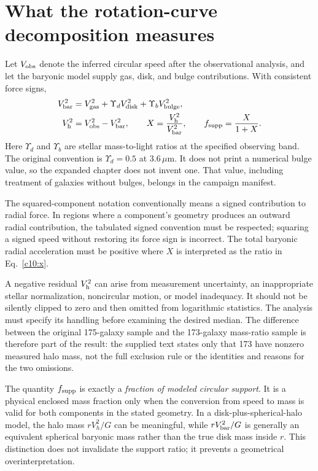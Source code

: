 \section{What the rotation-curve decomposition measures}

Let $V_{\rm obs}$ denote the inferred circular speed after the observational analysis, and let the baryonic model supply gas, disk, and bulge contributions. With consistent force signs,
\begin{align}
 V_{\rm bar}^2&=V_{\rm gas}^2+\Upsilon_dV_{\rm disk}^2
 +\Upsilon_bV_{\rm bulge}^2,\label{c10:baryons}\\
 V_{\rm h}^2&=V_{\rm obs}^2-V_{\rm bar}^2,\qquad
 X=\frac{V_{\rm h}^2}{V_{\rm bar}^2},\qquad
 f_{\rm supp}=\frac{X}{1+X}.
 \label{c10:x}
\end{align}
Here $\Upsilon_d$ and $\Upsilon_b$ are stellar mass-to-light ratios at the specified observing band. The original convention is $\Upsilon_d=0.5$ at $3.6\,\mu\mathrm m$. It does not print a numerical bulge value, so the expanded chapter does not invent one. That value, including treatment of galaxies without bulges, belongs in the campaign manifest.

The squared-component notation conventionally means a signed contribution to radial force. In regions where a component's geometry produces an outward radial contribution, the tabulated signed convention must be respected; squaring a signed speed without restoring its force sign is incorrect. The total baryonic radial acceleration must be positive where $X$ is interpreted as the ratio in Eq.~\eqref{c10:x}.

A negative residual $V_{\rm h}^2$ can arise from measurement uncertainty, an inappropriate stellar normalization, noncircular motion, or model inadequacy. It should not be silently clipped to zero and then omitted from logarithmic statistics. The analysis must specify its handling before examining the desired median. The difference between the original 175-galaxy sample and the 173-galaxy mass-ratio sample is therefore part of the result: the supplied text states only that 173 have nonzero measured halo mass, not the full exclusion rule or the identities and reasons for the two omissions.

The quantity $f_{\rm supp}$ is exactly a \emph{fraction of modeled circular support}. It is a physical enclosed mass fraction only when the conversion from speed to mass is valid for both components in the stated geometry. In a disk-plus-spherical-halo model, the halo mass $rV_h^2/G$ can be meaningful, while $rV_{\rm bar}^2/G$ is generally an equivalent spherical baryonic mass rather than the true disk mass inside $r$. This distinction does not invalidate the support ratio; it prevents a geometrical overinterpretation.

